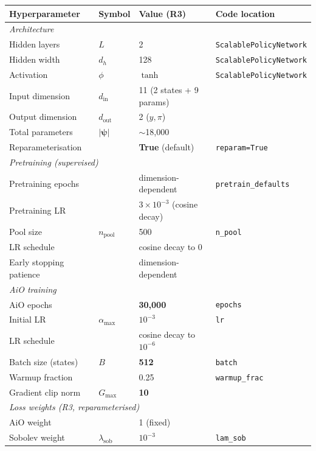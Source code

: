 \documentclass[11pt,a4paper]{article}
\theoremstyle{definition}
\newcommand{\bpsi}{\boldsymbol{\psi}}
\newcommand{\code}[1]{\texttt{\color{codecolor}#1}}
\begin{document}
	\begin{center}
		\begin{tabular}{llll}
			\toprule
			Hyperparameter & Symbol & Value (R3) & Code location \\
			\midrule
			\multicolumn{4}{l}{\textit{Architecture}} \\
			Hidden layers & $L$ & 2 & \code{ScalablePolicyNetwork} \\
			Hidden width & $d_h$ & 128 & \code{ScalablePolicyNetwork} \\
			Activation & $\phi$ & $\tanh$ & \code{ScalablePolicyNetwork} \\
			Input dimension & $d_{\mathrm{in}}$ & 11 (2 states + 9 params) & \\
			Output dimension & $d_{\mathrm{out}}$ & 2 ($y, \pi$) & \\
			Total parameters & $|\bpsi|$ & $\sim$18,000 & \\
			Reparameterisation & & \textbf{True} (default) & \code{reparam=True} \\
			\midrule
			\multicolumn{4}{l}{\textit{Pretraining (supervised)}} \\
			Pretraining epochs & & dimension-dependent & \code{pretrain\_defaults} \\
			Pretraining LR & & $3 \times 10^{-3}$ (cosine decay) & \\
			Pool size & $n_{\mathrm{pool}}$ & 500 & \code{n\_pool} \\
			LR schedule & & cosine decay to 0 & \\
			Early stopping patience & & dimension-dependent & \\
			\midrule
			\multicolumn{4}{l}{\textit{AiO training}} \\
			AiO epochs & & \textbf{30,000} & \code{epochs} \\
			Initial LR & $\alpha_{\max}$ & $10^{-3}$ & \code{lr} \\
			LR schedule & & cosine decay to $10^{-6}$ & \\
			Batch size (states) & $B$ & \textbf{512} & \code{batch} \\
			Warmup fraction & & 0.25 & \code{warmup\_frac} \\
			Gradient clip norm & $G_{\max}$ & \textbf{10} & \\
			\midrule
			\multicolumn{4}{l}{\textit{Loss weights (R3, reparameterised)}} \\
			AiO weight & & 1 (fixed) & \\
			Sobolev weight & $\lambda_{\mathrm{sob}}$ & $10^{-3}$ & \code{lam\_sob} \\

\end{tabular}
\end{center}
\end{document}
